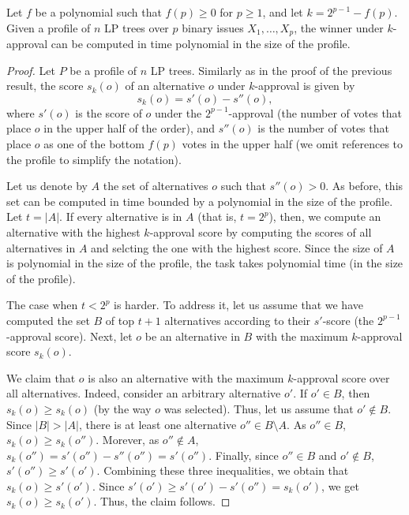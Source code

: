 
\begin{thm}
\label{thm2}
Let $f$ be a polynomial such that $f(p)\geq 0$ for $p\geq 1$, and let
$k=2^{p-1}-f(p)$. Given a profile of $n$ LP trees over $p$ binary issues 
$X_1,\ldots,X_p$, the winner under $k$-approval can be computed in time 
polynomial in the size of the profile.
\end{thm}
\begin{proof}
Let $P$ be a profile of $n$ LP trees. Similarly as in the proof of the
previous result, the score $s_k(o)$ of an alternative $o$ under 
$k$-approval is given by
\[
s_k(o) = s'(o)-s''(o),
\]
where $s'(o)$ is the score of $o$ under the $2^{p-1}$-approval (the number
of votes that place $o$ in the upper half of the order), and $s''(o)$ is the
number of votes that place $o$ as one of the bottom $f(p)$ votes in the upper
half (we omit references to the profile to simplify the notation).

Let us denote by $A$ the set of alternatives $o$ such that $s''(o)>0$.
As before, this set can be computed in time bounded by a polynomial in 
the size of the profile. Let $t=|A|$. If every alternative is in $A$
(that is, $t=2^p$), then, we compute an alternative with the highest
$k$-approval score by computing the scores of all alternatives in $A$
and selcting the one with the highest score. Since the size of $A$ is
polynomial in the size of the profile, the task takes polynomial time
(in the size of the profile).

The case when $t< 2^p$ is harder. To address it, let us assume that we 
have computed the set $B$ of top $t+1$ alternatives according to their 
$s'$-score (the $2^{p-1}$-approval score). Next, let $o$ be an alternative 
in $B$ with the maximum $k$-approval score $s_k(o)$.

We claim that $o$ is also an alternative with the maximum $k$-approval 
score over all alternatives. Indeed, consider an arbitrary alternative 
$o'$. If $o'\in B$, then $s_k(o)\geq s_k(o)$ (by the way $o$ was selected). 
Thus, let us assume that $o'\notin B$. Since $|B|> |A|$, there is at least 
one alternative $o''\in B\setminus A$. As $o''\in B$, $s_k(o)\geq s_k(o'')$.
Morever, as $o''\notin A$, $s_k(o'')=s'(o'')-s''(o'')=s'(o'')$. Finally,
since $o''\in B$ and $o'\notin B$, $s'(o'')\geq s'(o')$. Combining these 
three inequalities, we obtain that $s_k(o) \geq s'(o')$. Since $s'(o')\geq 
s'(o')-s'(o'')=s_k(o')$, we get $s_k(o)\geq s_k(o')$. Thus, the claim follows.


\end{proof}

